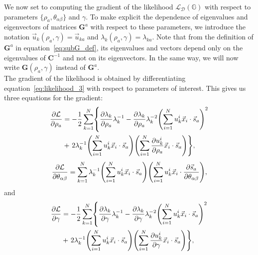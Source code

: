 \documentclass[preprint,amsmath,amssymb,superscriptaddress,showpacs,pre]{revtex4-1}
\let\originalleft\left
\let\originalright\right
\renewcommand{\left}{\mathopen{}\mathclose\bgroup\originalleft}
\renewcommand{\right}{\aftergroup\egroup\originalright}
\def\vx{\vec x}
\newcommand{\iC}{\bm{C}^{-1}}
\newcommand{\vsa}{\vec{s}_a}
\newcommand{\vuka}{\vec{u}_{ka}}
\begin{document}
We now set to computing the gradient of the likelihood $\mathcal{L}_{\mathcal{D}}(\mathbb{G})$ with respect to parameters $\{\rho_a, \theta_{\alpha\beta}\}$ and $\gamma$. 
To make explicit the dependence of eigenvalues and eigenvectors of matrices $\mathbf{G}^a$ with respect to these parameters, we introduce the notation $\vec{u}_k(\rho_a,\gamma) = \vuka$ and $\lambda_k(\rho_a,\gamma) = \lambda_{ka}$. 
Note that from the definition of $\mathbf{G}^a$ in equation~\ref{eq:subG_def}, its eigenvalues and vectors depend only on the eigenvalues of $\iC$ and not on its eigenvectors. 
In the same way, we will now write $\mathbf{G}(\rho_a,\gamma)$ instead of $\mathbf{G}^a$. \\
The gradient of the likelihood is obtained by differentiating equation~\ref{eq:likelihood_3} with respect to parameters of interest. 
This gives us  three equations for the gradient: 
\begin{equation}
	\begin{split}
		\frac{\partial \mathcal{L}}{\partial\rho_a} &= -\frac 1 2 \sum_{k=1}^N \left\{ \frac{\partial\lambda_k}{\partial\rho_a}\lambda_k^{-1} - \frac{\partial\lambda_k}{\partial\rho_a} \lambda_k^{-2}\left(\sum_{i=1}^N u_{k}^i\vx_i\cdot\vsa\right)^2 \right. \\
		&+ \left. 2\lambda_k^{-1} \left(\sum_{i=1}^N u_k^i\vx_i\cdot\vsa\right) \left(\sum_{i=1}^N \frac{\partial u_k^i}{\partial\rho_a} \vx_i\cdot\vsa\right) \right\}, 
	\end{split}
	\label{eq:gradlikelihood_1}
\end{equation}
\begin{equation}
	\frac{\partial \mathcal{L}}{\partial\theta_{\alpha\beta}} = \sum_{k=1}^N \lambda_k^{-1} \left(\sum_{i=1}^N u_k^i\vx_i\cdot\vsa\right) \left(\sum_{i=1}^N u_k^i \vx_i\cdot\frac{\partial \vsa}{\partial\theta_{\alpha\beta}}\right),
	\label{eq:gradlikelihood_2}
\end{equation}
and
\begin{equation}
	\begin{split}
		\frac{\partial \mathcal{L}}{\partial\gamma} &= -\frac 1 2 \sum_{k=1}^N \left\{ \frac{\partial\lambda_k}{\partial\gamma}\lambda_k^{-1} - \frac{\partial\lambda_k}{\partial\gamma} \lambda_k^{-2}\left(\sum_{i=1}^N u_{k}^i\vx_i\cdot\vsa\right)^2 \right. \\
		&+ \left. 2\lambda_k^{-1} \left(\sum_{i=1}^N u_k^i\vx_i\cdot\vsa\right) \left(\sum_{i=1}^N \frac{\partial u_k^i}{\partial\gamma} \vx_i\cdot\vsa\right) \right\}, 
	\end{split}
	\label{eq:gradlikelihood_3}
\end{equation}
\end{document}
